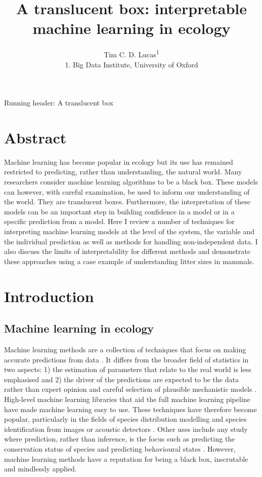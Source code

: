 \documentclass[12pt,]{article}
\title{A translucent box: interpretable machine learning in ecology}
\author{Tim C. D. Lucas\textsuperscript{1}\\
1. Big Data Institute, University of Oxford}
\date{}
\begin{document}
\maketitle

Running header: A translucent box

\section{Abstract}\label{abstract}

Machine learning has become popular in ecology but its use has remained restricted to predicting, rather than understanding, the natural world.
Many researchers consider machine learning algorithms to be a black box.
These models can however, with careful examination, be used to inform our understanding of the world.
They are translucent boxes.
Furthermore, the interpretation of these models can be an important step in building confidence in a model or in a specific prediction from a model.
Here I review a number of techniques for interpreting machine learning models at the level of the system, the variable and the individual prediction as well as methods for handling non-independent data.
I also discuss the limits of interpretability for different methods and demonstrate these approaches using a case example of understanding litter sizes in mammals.




\section{Introduction}\label{introduction}

\subsection{Machine learning in ecology}\label{machine-learning-in-ecology}

Machine learning methods are a collection of techniques that focus on making accurate predictions from data \citep{crisci2012review, breiman2001statistical, domingos}.
It differs from the broader field of statistics in two aspects: 1) the estimation of parameters that relate to the real world is less emphasised and 2) the driver of the predictions are expected to be the data rather than expert opinion and careful selection of plausible mechanistic models \citep{breiman2001statistical, domingos}.
High-level machine learning libraries that aid the full machine learning pipeline \citep{caret, scikit, maxent, biomod} have made machine learning easy to use.
These techniques have therefore become popular, particularly in the fields of species distribution modelling \citep{maxent, biomod, elith2006novel, golding2018zoon, gobeyn2019evolutionary} and species identification from images or acoustic detectors \citep{mac2018bat, waldchen2018machine, shamir2014classification, xue2017automatic, fairbrass2019citynet}.
Other uses include any study where prediction, rather than inference, is the focus such as predicting the conservation status of species \citep{bland2015predicting} and predicting behavioural states \citep{browning2018predicting}.
However, machine learning methods have a reputation for being a black box, inscrutable and mindlessly applied.
\end{document}
